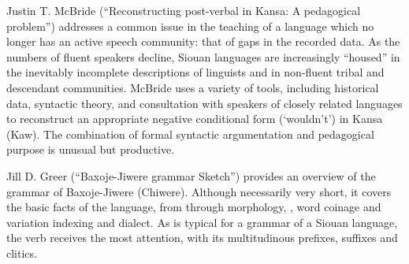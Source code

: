 \begin{refsection}
Justin T. McBride (``Reconstructing post-verbal  in Kansa: A pedagogical problem'') addresses a common issue in the teaching of a language which no longer has an active speech community: that of gaps in the recorded data. As the numbers of fluent speakers decline, Siouan languages are increasingly ``housed'' in the inevitably incomplete descriptions of linguists and in non-fluent tribal and descendant communities. McBride uses a variety of tools, including historical data, syntactic theory, and consultation with speakers of closely related languages to reconstruct an appropriate negative conditional form (`wouldn't') in Kansa (Kaw). The combination of formal syntactic argumentation and pedagogical purpose is unusual but productive. 

Jill D. Greer (``Baxoje-Jiwere grammar Sketch'') provides an overview of the grammar of Baxoje-Jiwere (Chiwere). Although necessarily very short, it covers the basic facts of the language, from  through morphology, , word coinage and variation indexing  and dialect. As is typical for a grammar of a Siouan language, the verb receives the most attention, with its multitudinous prefixes, suffixes and clitics. 
 

\printbibliography[heading=subbibliography,notkeyword=this]
 
\end{refsection}

